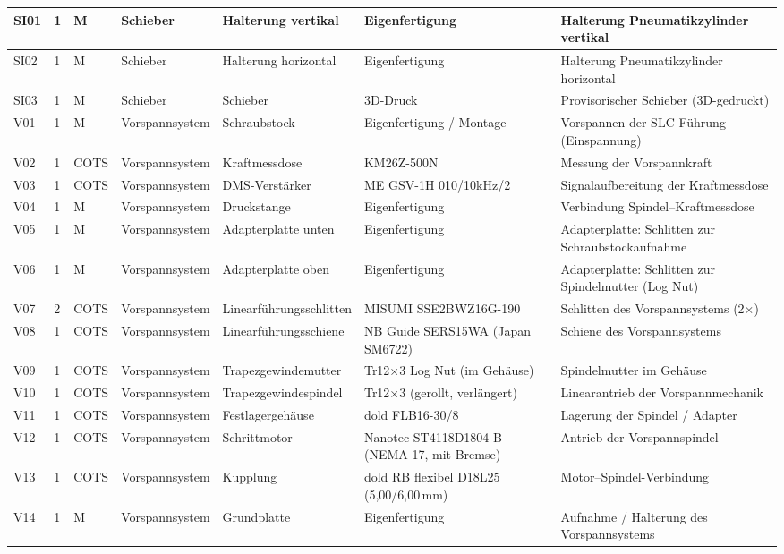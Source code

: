 \begin{landscape}
{\begin{longtable}{|l|l|l|l|l|p{4.6cm}|p{6.5cm}|}
SI01 & 1 & M & Schieber & Halterung vertikal & Eigenfertigung & Halterung Pneumatikzylinder vertikal \\
\hline
SI02 & 1 & M & Schieber & Halterung horizontal & Eigenfertigung & Halterung Pneumatikzylinder horizontal \\
\hline
SI03 & 1 & M & Schieber & Schieber & 3D-Druck & Provisorischer Schieber (3D-gedruckt) \\
\hline

V01 & 1 & M & Vorspannsystem & Schraubstock & Eigenfertigung / Montage & Vorspannen der SLC-Führung (Einspannung) \\
\hline
V02 & 1 & COTS & Vorspannsystem & Kraftmessdose & KM26Z-500N & Messung der Vorspannkraft \\
\hline
V03 & 1 & COTS & Vorspannsystem & DMS-Verstärker & ME GSV-1H 010/10kHz/2 & Signalaufbereitung der Kraftmessdose \\
\hline
V04 & 1 & M & Vorspannsystem & Druckstange & Eigenfertigung & Verbindung Spindel--Kraftmessdose \\
\hline
V05 & 1 & M & Vorspannsystem & Adapterplatte unten & Eigenfertigung & Adapterplatte: Schlitten zur Schraubstockaufnahme \\
\hline
V06 & 1 & M & Vorspannsystem & Adapterplatte oben & Eigenfertigung & Adapterplatte: Schlitten zur Spindelmutter (Log Nut) \\
\hline
V07 & 2 & COTS & Vorspannsystem & Linearführungsschlitten & MISUMI SSE2BWZ16G-190 & Schlitten des Vorspannsystems (2×) \\
\hline
V08 & 1 & COTS & Vorspannsystem & Linearführungsschiene & NB Guide SERS15WA (Japan SM6722) & Schiene des Vorspannsystems \\
\hline
V09 & 1 & COTS & Vorspannsystem & Trapezgewindemutter & Tr12×3 Log Nut (im Gehäuse) & Spindelmutter im Gehäuse \\
\hline
V10 & 1 & COTS & Vorspannsystem & Trapezgewindespindel & Tr12×3 (gerollt, verlängert) & Linearantrieb der Vorspannmechanik \\
\hline
V11 & 1 & COTS & Vorspannsystem & Festlagergehäuse & dold FLB16-30/8 & Lagerung der Spindel / Adapter \\
\hline
V12 & 1 & COTS & Vorspannsystem & Schrittmotor & Nanotec ST4118D1804-B (NEMA 17, mit Bremse) & Antrieb der Vorspannspindel \\
\hline
V13 & 1 & COTS & Vorspannsystem & Kupplung & dold RB flexibel D18L25 (5{,}00/6{,}00\,mm) & Motor--Spindel-Verbindung \\
\hline
V14 & 1 & M & Vorspannsystem & Grundplatte & Eigenfertigung & Aufnahme / Halterung des Vorspannsystems \\
\hline


\end{longtable}}
\end{landscape}
